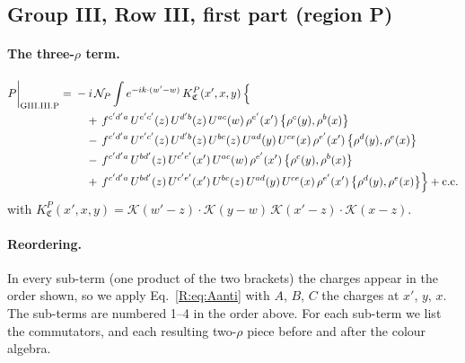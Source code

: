 \documentclass[10pt]{article}
\numberwithin{equation}{section}
\newcommand{\KK}{\mathcal K}
\newcommand{\NP}{\mathcal N_{P}}
\begin{document}
\subsection{Group III, Row III, first part (region P)}\label{B:sec:GIII.III.P}

\paragraph{The three-$\rho$ term.}
\begin{align}
P\bigg|_{\rm GIII.III.P}={}&-i\,\NP\int e^{-ik\cdot(w'-w)}\,K^{P}_{\mathfrak C}(x',x,y)\,\Big\{\notag\\
&\quad +\,f^{c'd'a}\,U^{e'c'}(z)\,U^{d'b}(z)\,U^{ac}(w)\,\rho^{e'}(x')\,\big\{\rho^{c}(y),\rho^{b}(x)\big\}\notag\\
&\quad -\,f^{c'd'a}\,U^{e'c'}(z)\,U^{d'b}(z)\,U^{bc}(z)\,U^{ad}(y)\,U^{ce}(x)\,\rho^{e'}(x')\,\big\{\rho^{d}(y),\rho^{e}(x)\big\}\notag\\
&\quad -\,f^{c'd'a}\,U^{bd'}(z)\,U^{c'e'}(x')\,U^{ac}(w)\,\rho^{e'}(x')\,\big\{\rho^{c}(y),\rho^{b}(x)\big\}\notag\\
&\quad +\,f^{c'd'a}\,U^{bd'}(z)\,U^{c'e'}(x')\,U^{bc}(z)\,U^{ad}(y)\,U^{ce}(x)\,\rho^{e'}(x')\,\big\{\rho^{d}(y),\rho^{e}(x)\big\}\Big\}+{\rm c.c.}\label{B:eq:in-GIII.III.P}
\end{align}
with $K^{P}_{\mathfrak C}(x',x,y)=\KK(w'-z)\cdot\KK(y-w)\,\KK(x'-z)\cdot\KK(x-z)$.
\paragraph{Reordering.} In every sub-term (one product of the two brackets) the charges appear in the order shown, so we apply Eq.~\eqref{R:eq:Aanti} with $A$, $B$, $C$ the charges at $x'$, $y$, $x$. The sub-terms are numbered 1--4 in the order above. For each sub-term we list the commutators, and each resulting two-$\rho$ piece before and after the colour algebra.
\end{document}
